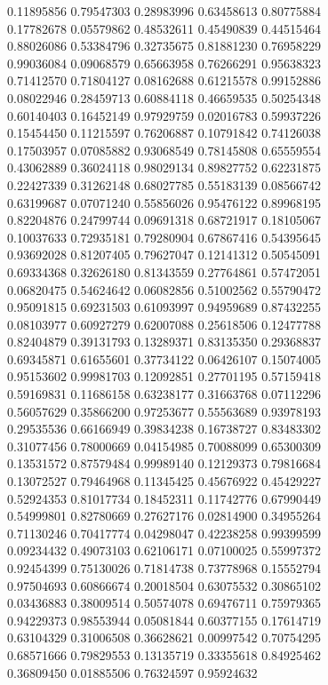 \begin{figure}
   0.11895856   0.79547303
   0.28983996   0.63458613
   0.80775884   0.17782678
   0.05579862   0.48532611
   0.45490839   0.44515464
   0.88026086   0.53384796
   0.32735675   0.81881230
   0.76958229   0.99036084
   0.09068579   0.65663958
   0.76266291   0.95638323
   0.71412570   0.71804127
   0.08162688   0.61215578
   0.99152886   0.08022946
   0.28459713   0.60884118
   0.46659535   0.50254348
   0.60140403   0.16452149
   0.97929759   0.02016783
   0.59937226   0.15454450
   0.11215597   0.76206887
   0.10791842   0.74126038
   0.17503957   0.07085882
   0.93068549   0.78145808
   0.65559554   0.43062889
   0.36024118   0.98029134
   0.89827752   0.62231875
   0.22427339   0.31262148
   0.68027785   0.55183139
   0.08566742   0.63199687
   0.07071240   0.55856026
   0.95476122   0.89968195
   0.82204876   0.24799744
   0.09691318   0.68721917
   0.18105067   0.10037633
   0.72935181   0.79280904
   0.67867416   0.54395645
   0.93692028   0.81207405
   0.79627047   0.12141312
   0.50545091   0.69334368
   0.32626180   0.81343559
   0.27764861   0.57472051
   0.06820475   0.54624642
   0.06082856   0.51002562
   0.55790472   0.95091815
   0.69231503   0.61093997
   0.94959689   0.87432255
   0.08103977   0.60927279
   0.62007088   0.25618506
   0.12477788   0.82404879
   0.39131793   0.13289371
   0.83135350   0.29368837
   0.69345871   0.61655601
   0.37734122   0.06426107
   0.15074005   0.95153602
   0.99981703   0.12092851
   0.27701195   0.57159418
   0.59169831   0.11686158
   0.63238177   0.31663768
   0.07112296   0.56057629
   0.35866200   0.97253677
   0.55563689   0.93978193
   0.29535536   0.66166949
   0.39834238   0.16738727
   0.83483302   0.31077456
   0.78000669   0.04154985
   0.70088099   0.65300309
   0.13531572   0.87579484
   0.99989140   0.12129373
   0.79816684   0.13072527
   0.79464968   0.11345425
   0.45676922   0.45429227
   0.52924353   0.81017734
   0.18452311   0.11742776
   0.67990449   0.54999801
   0.82780669   0.27627176
   0.02814900   0.34955264
   0.71130246   0.70417774
   0.04298047   0.42238258
   0.99399599   0.09234432
   0.49073103   0.62106171
   0.07100025   0.55997372
   0.92454399   0.75130026
   0.71814738   0.73778968
   0.15552794   0.97504693
   0.60866674   0.20018504
   0.63075532   0.30865102
   0.03436883   0.38009514
   0.50574078   0.69476711
   0.75979365   0.94229373
   0.98553944   0.05081844
   0.60377155   0.17614719
   0.63104329   0.31006508
   0.36628621   0.00997542
   0.70754295   0.68571666
   0.79829553   0.13135719
   0.33355618   0.84925462
   0.36809450   0.01885506
   0.76324597   0.95924632

\end{figure}
